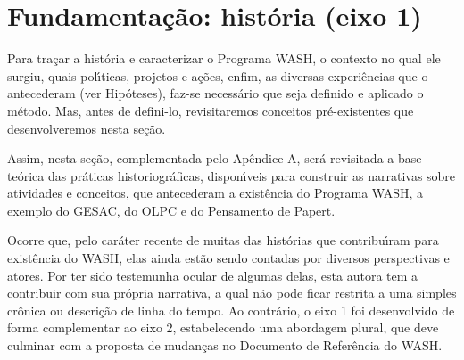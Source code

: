 \documentclass[
12pt,		%
openright,	%
twoside,  %
a4paper,			%
chapter=TITLE,		%
english,			%
french,				%
spanish,			%
brazil				%
]{USPSC-classe/USPSC}
\begin{document}
\section[Fundamenta\c{c}\~ao: hist\'oria (eixo 1)]{Fundamenta\c{c}\~ao: hist\'oria (eixo 1)}\label{Fundamenta\c{c}\~ao: hist\'oria (eixo 1)}
Para tra\c{c}ar a hist\'oria e caracterizar o Programa WASH, o contexto no qual ele surgiu, quais pol\'{\i}ticas, projetos e a\c{c}\~oes, enfim, as diversas experi\^encias que o antecederam (ver Hip\'oteses), faz-se  necess\'ario que seja definido e aplicado o m\'etodo. Mas, antes de defini-lo, revisitaremos conceitos pr\'e-existentes que  desenvolveremos nesta se\c{c}\~ao.

















Assim, nesta se\c{c}\~ao, complementada pelo Ap\^endice A, ser\'a revisitada a base te\'orica das pr\'aticas historiogr\'aficas, dispon\'{\i}veis para construir as narrativas sobre atividades e conceitos, que antecederam a exist\^encia do Programa WASH, a exemplo do GESAC, do OLPC e do Pensamento de Papert.



































Ocorre que, pelo car\'ater recente de muitas das hist\'orias que contribu\'{\i}ram para exist\^encia do WASH, elas ainda est\~ao sendo contadas por diversos perspectivas e atores. Por ter sido testemunha ocular de algumas delas, esta autora tem a contribuir com sua pr\'opria narrativa, a qual n\~ao pode ficar restrita a uma simples cr\^onica ou descri\c{c}\~ao de linha do tempo. Ao contr\'ario, o eixo 1 foi desenvolvido de forma complementar ao eixo 2, estabelecendo uma abordagem plural, que deve culminar com a proposta de mudan\c{c}as no Documento de Refer\^encia do WASH.
\end{document}
